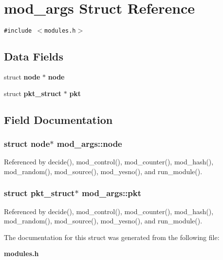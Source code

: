 \section{mod\_\-args Struct Reference}
\label{structmod__args}
{\tt \#include $<$modules.h$>$}

\subsection*{Data Fields}
\begin{CompactItemize}
\item 
struct {\bf node} $\ast$ {\bf node}
\item 
struct {\bf pkt\_\-struct} $\ast$ {\bf pkt}
\end{CompactItemize}


\subsection{Field Documentation}
\subsubsection[{node}]{\setlength{\rightskip}{0pt plus 5cm}struct {\bf node}$\ast$ {\bf mod\_\-args::node}\hspace{0.3cm}{\tt  [read]}}\label{structmod__args_afd1999b1f4711721c11a84be5bed2b1}




Referenced by decide(), mod\_\-control(), mod\_\-counter(), mod\_\-hash(), mod\_\-random(), mod\_\-source(), mod\_\-yesno(), and run\_\-module().
\subsubsection[{pkt}]{\setlength{\rightskip}{0pt plus 5cm}struct {\bf pkt\_\-struct}$\ast$ {\bf mod\_\-args::pkt}\hspace{0.3cm}{\tt  [read]}}\label{structmod__args_19edd12ce363d6e29fc37df4aeddf843}




Referenced by decide(), mod\_\-control(), mod\_\-counter(), mod\_\-hash(), mod\_\-random(), mod\_\-source(), mod\_\-yesno(), and run\_\-module().

The documentation for this struct was generated from the following file:\begin{CompactItemize}
\item 
{\bf modules.h}\end{CompactItemize}
